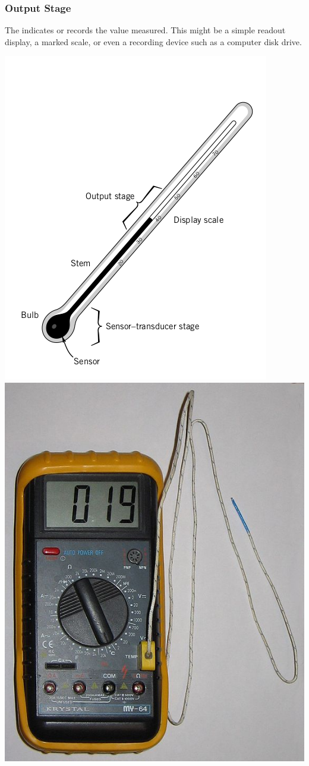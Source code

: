 \documentclass[fleqn]{beamer} %
\begin{document}
\begin{frame}
\frametitle{Output Stage}
The \hspcuu \hspcc \hspcuu indicates or records the value measured. This might be a simple readout
display, a marked scale, or even a recording device such as a computer disk drive.

\includegraphics[scale=0.25]{bulb_thermometer.png} \hspace{10mm}\includegraphics[scale=0.3]{thermocouple.jpg}


\end{frame}
\end{document}
